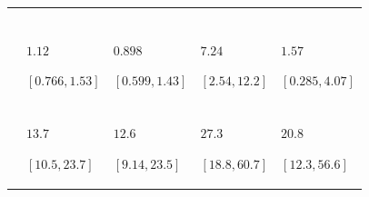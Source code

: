 \begin{table}
\centering
\begin{tabular}{>{\raggedleft\arraybackslash}m{1.2cm}>{\raggedright\arraybackslash}m{2.3cm}>{\raggedright\arraybackslash}m{2.3cm}>{\raggedright\arraybackslash}m{2.3cm}>{\raggedright\arraybackslash}m{2.3cm}}
\toprule
\multicolumn{1}{c}{\cellcolor{blue!15!gray}{}} & \multicolumn{2}{c}{\cellcolor{blue!15!gray}{All ages}} & \multicolumn{2}{c}{\cellcolor{blue!15!gray}{Adults only}} \\
\cellcolor{blue!15!gray}{Estimate} & \cellcolor{blue!15!gray}{Females} & \cellcolor{blue!15!gray}{Males} & \cellcolor{blue!15!gray}{Females} & \cellcolor{blue!15!gray}{Males}\\
\midrule
\addlinespace[0.3em]
\multicolumn{5}{l}{\cellcolor{blue!5!white!90!black}{\textbf{Variances}}}\\
\hspace{1em}\cellcolor{blue!5!white!90!black}{$V_{\text{Add}}$} & \cellcolor{gray}{$3.11$\par $[1.81,4.63]$} & \cellcolor{gray}{$2.48$\par $[1.24,4.48]$} & \cellcolor{gray}{$7.41$\par $[2.68,12.2]$} & \cellcolor{gray}{$1.79$\par $[0.369,4.48]$}\\
\hspace{1em}\cellcolor{blue!5!white!90!black}{$V_{\text{A}}$} & $1.12$\par $[0.766,1.53]$ & $0.898$\par $[0.599,1.43]$ & $7.24$\par $[2.54,12.2]$ & $1.57$\par $[0.285,4.07]$\\
\hspace{1em}\cellcolor{blue!5!white!90!black}{$V_{\text{AxAge}}$} & \cellcolor{gray}{$1.99$\par $[1.02,3.07]$} & \cellcolor{gray}{$1.57$\par $[0.644,3.06]$} & \cellcolor{gray}{$0.113$\par $[0.0147,0.405]$} & \cellcolor{gray}{$0.195$\par $[0.0317,0.629]$}\\
\hspace{1em}\cellcolor{blue!5!white!90!black}{$V_{\text{Tot}}$} & $13.7$\par $[10.5,23.7]$ & $12.6$\par $[9.14,23.5]$ & $27.3$\par $[18.8,60.7]$ & $20.8$\par $[12.3,56.6]$\\

\end{tabular}
\end{table}
